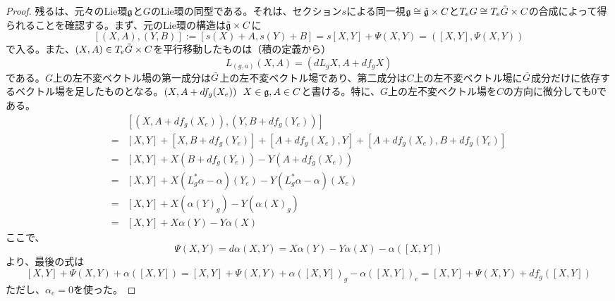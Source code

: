 \begin{proof}
    残るは、元々のLie環$\mathfrak{g}$と$G$のLie環の同型である。それは、セクション$s$による同一視$\mathfrak{g}\cong\Tilde{\mathfrak{g}}\times C$と$T_e G\cong T_e\Tilde{G}\times C$の合成によって得られることを確認する。まず、元のLie環の構造は$\Tilde{\mathfrak{g}}\times C$に
    \[[(X,A),(Y,B)]:=[s(X)+A,s(Y)+B]=s[X,Y]+\Psi(X,Y)=([X,Y],\Psi(X,Y))\]
    で入る。また、$(X,A)\in T_e\Tilde{G}\times C$を平行移動したものは（積の定義から）
    \[L_{(g,a)}(X,A)=(dL_gX,A+df_gX)\]
    である。$G$上の左不変ベクトル場の第一成分は$\Tilde{G}$上の左不変ベクトル場であり、第二成分は$C$上の左不変ベクトル場に$\Tilde{G}$成分だけに依存するベクトル場を足したものとなる。$(X,A+df_g(X_e))\ \ X\in\mathfrak{g},A\in C$と書ける。特に、$G$上の左不変ベクトル場を$C$の方向に微分しても0である。
    \begin{align*}
        &[(X,A+df_g(X_e)),(Y,B+df_g(Y_e))]\\
        =& [X,Y]+[X,B+df_g(Y_e)]+[A+df_g(X_e),Y]+[A+df_g(X_e),B+df_g(Y_e)]\\
        =& [X,Y]+X(B+df_g(Y_e))-Y(A+df_g(X_e))\\
        =& [X,Y]+X(L_g^*\alpha-\alpha)(Y_e)-Y(L_g^*\alpha-\alpha)(X_e)\\
        =& [X,Y]+X(\alpha(Y)_g)-Y(\alpha(X)_g)\\
        =& [X,Y]+X\alpha(Y)-Y\alpha(X)
    \end{align*}
    ここで、
    \[\Psi(X,Y)=d\alpha(X,Y)=X\alpha(Y)-Y\alpha(X)-\alpha([X,Y])\]
    より、最後の式は
    \[[X,Y]+\Psi(X,Y)+\alpha([X,Y])=[X,Y]+\Psi(X,Y)+\alpha([X,Y])_g-\alpha([X,Y])_e=[X,Y]+\Psi(X,Y)+df_g([X,Y])\]
    ただし、$\alpha_e=0$を使った。
\end{proof}



\newpage
